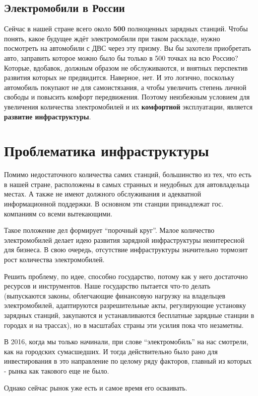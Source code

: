 \documentclass[a4paper,12pt]{report}
\begin{document}
\section{Электромобили в России}
Сейчас в нашей стране всего около \textbf{500} полноценных зарядных станций. Чтобы понять, какое будущее ждёт электромобили при таком раскладе, нужно посмотреть на автомобили с ДВС через эту призму. Вы бы захотели приобретать авто, заправить которое можно было бы только в 500 точках на всю Россию? Которые, вдобавок, должным образом не обслуживаются, и внятных перспектив развития которых не предвидится. Наверное, нет. И это логично, поскольку автомобиль покупают не для самоистязания, а чтобы увеличить степень личной свободы и повысить комфорт передвижения. Поэтому неизбежным условием для увеличения количества электромобилей и их \textbf{комфортной} эксплуатации, является \textbf{развитие инфраструктуры}. 

\chapter{Проблематика инфраструктуры}
Помимо недостаточного количества самих станций, большинство из тех, что есть в нашей стране, расположены в самых странных и неудобных для автовладельца местах. А также не имеют должного обслуживания и адекватной информационной поддержки. В основном эти станции принадлежат гос. компаниям со всеми вытекающими.

Такое положение дел формирует “порочный круг”. Малое количество электромобилей делает идею развития зарядной инфраструктуры неинтересной для бизнеса. В свою очередь, отсутствие инфраструктуры значительно тормозит рост количества электромобилей. 

Решить проблему, по идее, способно государство, потому как у него достаточно ресурсов и инструментов. Наше государство пытается что-то делать (выпускаются законы, облегчающие финансовую нагрузку на владельцев электромобилей, адаптируются разрешительные акты, регулирующие установку зарядных станций, закупаются и устанавливаются бесплатные зарядные станции в городах и на трассах), но в масштабах страны эти усилия пока что незаметны. 

В 2016, когда мы только начинали, при слове “электромобиль” на нас смотрели, как на городских сумасшедших. И тогда действительно было рано для инвестирования в это направление по целому ряду факторов, главный из которых - рынка как такового еще не было. 

Однако сейчас рынок уже есть и самое время его осваивать.  
\end{document}
